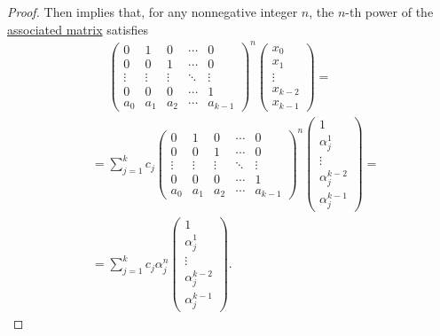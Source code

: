 \begin{proof}
  Then  implies that, for any nonnegative integer \( n \), the \( n \)-th power of the \hyperref[def:homogeneous_linear_recurrence_matrix]{associated matrix} satisfies
  \begin{align*}
    &\phantom{{}={}}
    \begin{pmatrix}
      0      & 1      & 0      & \cdots & 0      \\
      0      & 0      & 1      & \cdots & 0      \\
      \vdots & \vdots & \vdots & \ddots & \vdots \\
      0      & 0      & 0      & \cdots & 1      \\
      a_0    & a_1    & a_2    & \cdots & a_{k-1}
    \end{pmatrix}^n
    \begin{pmatrix}
      x_0     \\
      x_1     \\
      \vdots  \\
      x_{k-2} \\
      x_{k-1}
    \end{pmatrix}
    = \\ &=
    \sum_{j=1}^k c_j
    \begin{pmatrix}
      0      & 1      & 0      & \cdots & 0      \\
      0      & 0      & 1      & \cdots & 0      \\
      \vdots & \vdots & \vdots & \ddots & \vdots \\
      0      & 0      & 0      & \cdots & 1      \\
      a_0    & a_1    & a_2    & \cdots & a_{k-1}
    \end{pmatrix}^n
    \begin{pmatrix}
      1              \\
      \alpha_j^1     \\
      \vdots         \\
      \alpha_j^{k-2} \\
      \alpha_j^{k-1}
    \end{pmatrix}
    = \\ &=
    \sum_{j=1}^k c_j \alpha_j^n
    \begin{pmatrix}
      1              \\
      \alpha_j^1     \\
      \vdots         \\
      \alpha_j^{k-2} \\
      \alpha_j^{k-1}
    \end{pmatrix}.
  \end{align*}


\end{proof}
